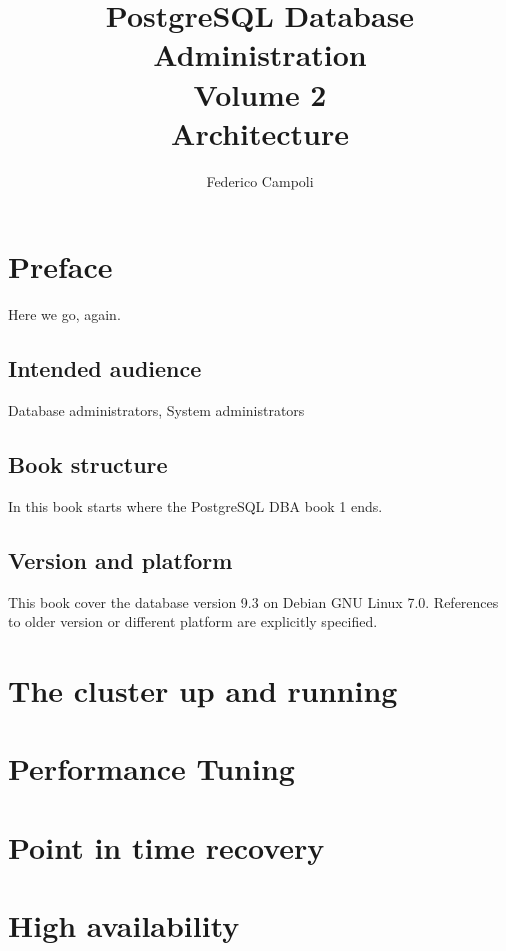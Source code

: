 \documentclass[oneside]{book}
\author{Federico Campoli}
\title{PostgreSQL Database Administration \\ Volume 2 \\ Architecture}
\begin{document}
\maketitle

\newpage{}



\tableofcontents{}

\chapter*{Preface}
Here we go, again. 




\section*{Intended audience}
Database administrators, System administrators

\section*{Book structure}
In this book starts where the PostgreSQL DBA book 1 ends.\newline


\section*{Version and platform}
This book cover the database version 9.3 on Debian GNU Linux 7.0.
References to older version or different platform are explicitly specified.





\chapter{The cluster up and running}
\chapter{Performance Tuning}
\chapter{Point in time recovery}
\chapter{High availability}

\appendix

\listoffigures
\listoftables
\printindex{}
\end{document}
